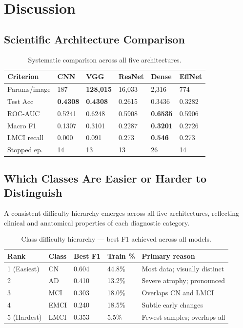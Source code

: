 \documentclass[12pt, a4paper]{article}
\begin{document}
\section{Discussion}
\label{sec:discussion}

\subsection{Scientific Architecture Comparison}

\begin{table}[H]
\centering
\caption{Systematic comparison across all five architectures.}
\label{tab:compare}
\begin{tabular}{llllll}
\toprule
\textbf{Criterion} & \textbf{CNN} & \textbf{VGG}
    & \textbf{ResNet} & \textbf{Dense} & \textbf{EffNet}\\
\midrule
Params/image & 187 & \textbf{128,015} & 16,033
    & 2,316 & 774\\
Test Acc     & \textbf{0.4308} & \textbf{0.4308}
    & 0.2615 & 0.3436 & 0.3282\\
ROC-AUC      & 0.5241 & 0.6248 & 0.5908
    & \textbf{0.6535} & 0.5906\\
Macro F1     & 0.1307 & 0.3101 & 0.2287
    & \textbf{0.3201} & 0.2726\\
LMCI recall  & 0.000  & 0.091  & 0.273
    & \textbf{0.546}  & 0.273\\
Stopped ep.  & 14 & 13 & 13 & 26 & 14\\
\bottomrule
\end{tabular}
\end{table}

\subsection{Which Classes Are Easier or Harder
to Distinguish}

A consistent difficulty hierarchy emerges across all
five architectures, reflecting clinical and anatomical
properties of each diagnostic category.

\begin{table}[H]
\centering
\caption{Class difficulty hierarchy --- best F1
achieved across all models.}
\label{tab:difficulty}
\begin{tabular}{lllll}
\toprule
\textbf{Rank} & \textbf{Class} & \textbf{Best F1}
    & \textbf{Train \%} & \textbf{Primary reason}\\
\midrule
1 (Easiest) & CN   & 0.604 & 44.8\%
    & Most data; visually distinct\\
2           & AD   & 0.410 & 13.2\%
    & Severe atrophy; pronounced\\
3           & MCI  & 0.303 & 18.0\%
    & Overlaps CN and LMCI\\
4           & EMCI & 0.240 & 18.5\%
    & Subtle early changes\\
5 (Hardest) & LMCI & 0.353 & 5.5\%
    & Fewest samples; overlaps all\\
\bottomrule
\end{tabular}
\end{table}
\end{document}
